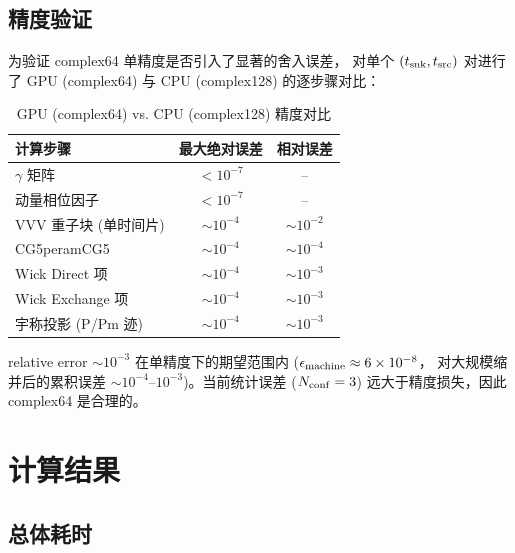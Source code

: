 \documentclass[11pt,a4paper]{article}
\begin{document}
\subsection{精度验证}

为验证 complex64 单精度是否引入了显著的舍入误差，
对单个 $(t_{\rm snk}, t_{\rm src})$ 对进行了 GPU (complex64) 与
CPU (complex128) 的逐步骤对比：

\begin{table}[H]
  \centering
  \caption{GPU (complex64) vs. CPU (complex128) 精度对比}
  \label{tab:precision}
  \begin{tabular}{lcc}
    \toprule
    计算步骤 & 最大绝对误差 & 相对误差 \\
    \midrule
    $\gamma$ 矩阵 & $< 10^{-7}$ & -- \\
    动量相位因子 & $< 10^{-7}$ & -- \\
    VVV 重子块 (单时间片) & $\sim 10^{-4}$ & $\sim 10^{-2}$ \\
    CG5peramCG5 & $\sim 10^{-4}$ & $\sim 10^{-4}$ \\
    Wick Direct 项 & $\sim 10^{-4}$ & $\sim 10^{-3}$ \\
    Wick Exchange 项 & $\sim 10^{-4}$ & $\sim 10^{-3}$ \\
    宇称投影 (P/Pm 迹) & $\sim 10^{-4}$ & $\sim 10^{-3}$ \\
    \bottomrule
  \end{tabular}
\end{table}

relative error $\sim 10^{-3}$ 在单精度下的期望范围内 ($\epsilon_{\rm machine} \approx 6\times 10^{-8}$，
对大规模缩并后的累积误差 $\sim 10^{-4}$--$10^{-3}$)。当前统计误差 ($N_{\rm conf}=3$)
远大于精度损失，因此 complex64 是合理的。

\section{计算结果}

\subsection{总体耗时}
\end{document}
